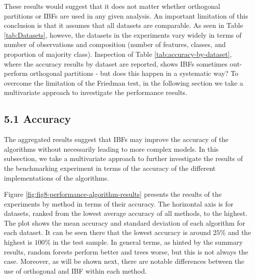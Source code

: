 \documentclass[]{elsarticle} %
\begin{document}
These results would suggest that it does not matter whether orthogonal
partitions or IBFs are used in any given analysis. An important
limitation of this conclusion is that it assumes that all datasets are
comparable. As seen in Table \ref{tab:Datasets}, howeve, the datasets in
the experiments vary widely in terms of number of observations and
composition (number of features, classes, and proportion of majority
class). Inspection of Table \ref{tab:accuracy-by-dataset}, where the
accuracy results by dataset are reported, shows IBFs sometimes
out-perform orthogonal partitions - but does this happen in a systematic
way? To overcome the limitation of the Friedman test, in the following
section we take a multivariate approach to investigate the performance
results.

\subsection{5.1 Accuracy}\label{accuracy}

The aggregated results suggest that IBFs may improve the accuracy of the
algorithms without necessarily leading to more complex models. In this
subsection, we take a multivariate approach to further investigate the
results of the benchmarking experiment in terms of the accuracy of the
different implementations of the algorithms.

Figure \ref{fig:fig8-performance-algorithm-results} presents the results
of the experiments by method in terms of their accuracy. The horizontal
axis is for datasets, ranked from the lowest average accuracy of all
methods, to the highest. The plot shows the mean accuracy and standard
deviation of each algorithm for each dataset. It can be seen there that
the lowest accuracy is around \(25\)\% and the highest is \(100\)\% in
the test sample. In general terms, as hinted by the summary results,
random forests perform better and trees worse, but this is not always
the case. Moreover, as will be shown next, there are notable differences
between the use of orthogonal and IBF within each method.
\end{document}
